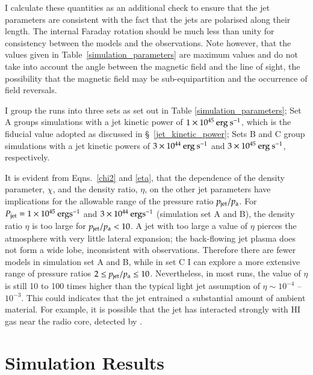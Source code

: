 I calculate these quantities as an additional check to ensure that the jet parameters are consistent with the fact that the jets are polarised along their length. The internal Faraday rotation should be much less than unity for consistency between the models and the observations. Note however, that the values given in Table~\ref{simulation_parameters} are maximum values and do not take into account the angle between the magnetic field and the line of sight, the possibility that the magnetic field may be sub-equipartition and the occurrence of field reversals.

I group the runs into three sets as set out in Table \ref{simulation_parameters}; Set A groups simulations with a jet kinetic power of $1\times10^{45} \> \rm erg \> s^{-1}$, which is the fiducial value adopted as discussed in \S~\ref{jet_kinetic_power}; Sets B and C group simulations with a jet kinetic powers of $3 \times 10^{44} \> \rm erg \> s^{-1}$ and 
$3 \times 10^{45} \> \rm erg \> s^{-1}$, respectively.   

It is evident from Eqns.~\eqref{chi2} and \eqref{eta}, that the dependence of the density parameter, $\chi$, and the density ratio, $\eta$, on the other jet parameters have implications for the allowable range of the pressure ratio $p_{\rm{jet}}/p_{\rm{a}}$. For $P_\mathrm{jet}=1\times10^{45} \> \rm erg s^{-1}$ and $3\times10^{44} \> \rm erg s^{-1}$ (simulation set A and B), the density ratio $\eta$ is too large for $p_{\rm{jet}}/p_{\rm{a}}<10$. A jet with too large a value of $\eta$ pierces the atmosphere with very little lateral expansion; the back-flowing jet plasma does not form a wide lobe, inconsistent with observations. Therefore there are fewer models in simulation set A and B, while in set C I can explore a more extensive  range of pressure ratios $2\leq p_{\rm{jet}}/p_{\rm{a}}\leq10$. Nevertheless, in most runs, the value of 
$\eta$ is still 10 to 100 times higher than the typical light jet assumption of  $\eta \sim 10^{-4}$ -- $10^{-3}$. This could indicates that the jet entrained a substantial amount of ambient material. For example, it is possible that the jet has interacted strongly with HI gas near the radio core, detected by \citet{dwarakanath95}.

%
%

\section{Simulation Results}\label{s:sims}

